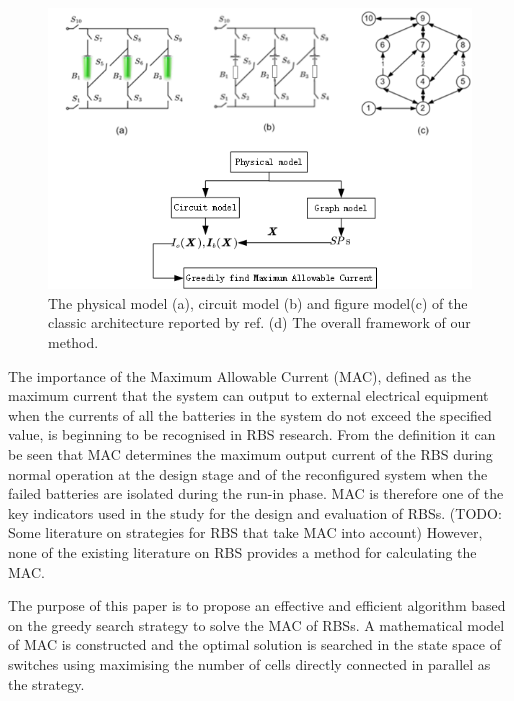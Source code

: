 \documentclass{article}
\begin{document}
\begin{figure}
    \centering
    \includegraphics[width=\textwidth]{../attachments/fig1.png}
    \caption{The physical model (a), circuit model (b) and figure model(c) of the classic architecture reported by ref. (d) The overall framework of our method.}
\end{figure}


The importance of the Maximum Allowable Current (MAC), defined as the maximum current that the system can output to external electrical equipment when the currents of all the batteries in the system do not exceed the specified value, is beginning to be recognised in RBS research. 
From the definition it can be seen that MAC determines the maximum output current of the RBS during normal operation at the design stage and of the reconfigured system when the failed batteries are isolated during the run-in phase. 
MAC is therefore one of the key indicators used in the study for the design and evaluation of RBSs.
(TODO: Some literature on strategies for RBS that take MAC into account)
However, none of the existing literature on RBS provides a method for calculating the MAC.


The purpose of this paper is to propose an effective and efficient algorithm based on the greedy search strategy to solve the MAC of RBSs. 
A mathematical model of MAC is constructed and the optimal solution is searched in the state space of switches using maximising the number of cells directly connected in parallel as the strategy.
\end{document}
